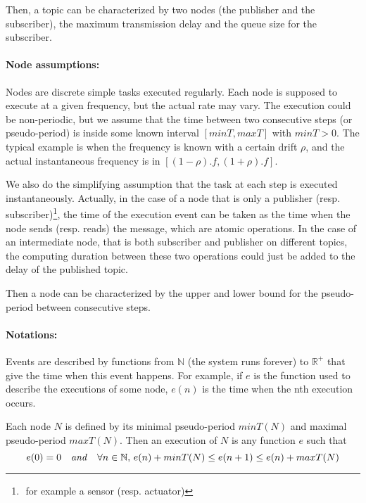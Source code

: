 Then, a topic can be characterized by two nodes (the publisher and the subscriber), the maximum transmission delay and the queue size for the subscriber.


\paragraph{Node assumptions:}
Nodes are discrete simple tasks executed regularly.
Each node is supposed to execute at a given frequency, but the actual rate may vary.
The execution could be non-periodic, but we assume that the time between two consecutive steps (or pseudo-period) is inside some known interval $[minT, maxT]$ with $minT > 0$.
The typical example is when the frequency is known with a certain drift $\rho$, and the actual instantaneous frequency is in $[(1-\rho).f, (1+\rho).f]$.

We also do the simplifying assumption that the task at each step is executed instantaneously. 
Actually, in the case of a node that is only a publisher (resp. subscriber)\footnote{$ $ for example a sensor (resp. actuator)}, the time of the execution event can be taken as the time when the node sends (resp. reads) the message, which are atomic operations.
In the case of an intermediate node, that is both subscriber and publisher on different topics, the computing duration between these two operations could just be added to the delay of the published topic.

Then a node can be characterized by the upper and lower bound for the pseudo-period between consecutive steps.


\paragraph{Notations:}
Events are described by functions from $\mathbb{N}$ (the system runs forever) to $\mathbb{R^+}$ that give the time when this event happens. For example, if $e$ is the function used to describe the executions of some node, $e(n)$ is the time when the nth execution occurs.

\begin{defin}

Each node $N$ is defined by its minimal pseudo-period $minT(N)$ and maximal pseudo-period $maxT(N)$. 
Then an execution of $N$ is any function $e$ such that
\[ e(0) = 0 \quad \textrm{\emph{and}} \quad \forall n \in \mathbb{N}, \, 
e(n) + minT(N) \leq e(n+1) \leq e(n) + maxT(N) \]
\end{defin}

